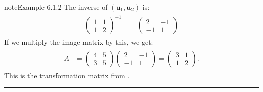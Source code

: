 \documentclass[letterpaper,10pt,english]{jupyterBook}
\begin{document}
\begin{sphinxadmonition}{note}{Example 6.1.2}
\sphinxAtStartPar
The inverse of \((\mathbf{u}_1, \mathbf{u}_2)\) is:
\begin{equation*}
\begin{split} \begin{align*}
    \begin{pmatrix} 1 & 1 \\ 1 & 2 \end{pmatrix}^{-1} &= \begin{pmatrix} 2 & -1 \\ -1 & 1 \end{pmatrix}
\end{align*} \end{split}
\end{equation*}
\sphinxAtStartPar
If we multiply the image matrix by this, we get:
\begin{equation*}
\begin{split} \begin{align*}
    A &= \begin{pmatrix} 4 & 5 \\ 3 & 5 \end{pmatrix} \begin{pmatrix} 2 & -1 \\ -1 & 1 \end{pmatrix}
    = \begin{pmatrix} 3 & 1 \\ 1 & 2 \end{pmatrix}.
\end{align*} \end{split}
\end{equation*}
\sphinxAtStartPar
This is the transformation matrix from {\hyperref[\detokenize{_pages/6.1_Transformation_matrices:transformation-matrix-example}]{}}.
\end{sphinxadmonition}


\bigskip\hrule\bigskip


\ignorespaces 
\end{document}

